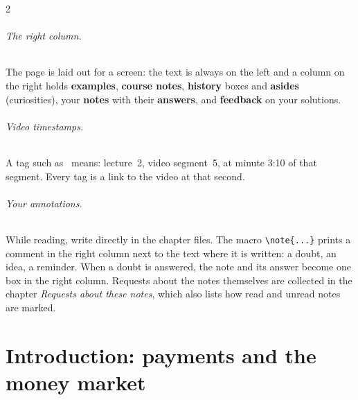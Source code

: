 \documentclass[12pt,oneside,openany]{book}
\begin{document}
\begin{paracol}{2}
\paragraph{The right column.} The page is laid out for a screen: the text is always on the left and a
column on the right holds \textcolor{intcol}{\textbf{examples}}, \textcolor{srccol}{\textbf{course notes}},
\textcolor{histcol}{\textbf{history}} boxes and \textcolor{histcol}{\textbf{asides}} (curiosities), your
\textcolor{notecol!80!black}{\textbf{notes}} with their \textcolor{anscol}{\textbf{answers}}, and
\textcolor{exercol}{\textbf{feedback}} on your solutions.

\paragraph{Video timestamps.} A tag such as \ means: lecture~2, video segment~5,
at minute 3:10 of that segment. Every tag is a link to the video at that second.

\paragraph{Your annotations.} While reading, write directly in the chapter files. The macro
\verb|\note{...}| prints a comment in the right column next to the text where it is written: a doubt,
an idea, a reminder. When a doubt is answered, the note and its answer become one box in the right
column. Requests about the notes themselves are collected in the chapter \emph{Requests about these
notes}, which also lists how read and unread notes are marked.

\flushside
\end{paracol}



\tableofcontents

\mainmatter
\part{Introduction: payments and the money market}\label{part:intro}












\end{document}
